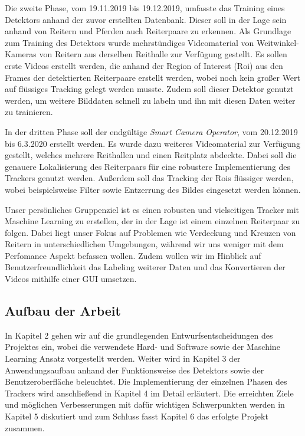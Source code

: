 Die zweite Phase, vom 19.11.2019 bis 19.12.2019, umfasste das Training eines Detektors anhand der zuvor erstellten Datenbank. Dieser soll in der Lage sein anhand von Reitern und Pferden auch Reiterpaare zu erkennen. Als Grundlage zum Training des Detektors wurde mehrstündiges Videomaterial von Weitwinkel-Kameras von Reitern aus derselben Reithalle zur Verfügung gestellt. Es sollen erste Videos erstellt werden, die anhand der Region of Interest (Roi) aus den Frames der detektierten Reiterpaare erstellt werden, wobei noch kein großer Wert auf flüssiges Tracking gelegt werden musste. Zudem soll dieser Detektor genutzt werden, um weitere Bilddaten schnell zu labeln und ihn mit diesen Daten weiter zu trainieren.

In der dritten Phase soll der endgültige \emph{Smart Camera Operator}, vom 20.12.2019 bis 6.3.2020 erstellt werden. Es wurde dazu weiteres Videomaterial zur Verfügung gestellt, welches mehrere Reithallen und einen Reitplatz abdeckte. Dabei soll die genauere Lokalisierung des Reiterpaars für eine robustere Implementierung des Trackers genutzt werden. Außerdem soll das Tracking der Rois flüssiger werden, wobei beispielsweise Filter sowie Entzerrung des Bildes eingesetzt werden können.

Unser persönliches Gruppenziel ist es einen robusten und vielseitigen Tracker mit Maschine Learning zu erstellen, der in der Lage ist einem einzelnen Reiterpaar zu folgen. Dabei liegt unser Fokus auf Problemen wie Verdeckung und Kreuzen von Reitern in unterschiedlichen Umgebungen, während wir uns weniger mit dem Perfomance Aspekt befassen wollen. Zudem wollen wir im Hinblick auf Benutzerfreundlichkeit das Labeling weiterer Daten und das Konvertieren der Videos mithilfe einer GUI umsetzen.




\subsection*{Aufbau der Arbeit}
In Kapitel 2 gehen wir auf die grundlegenden Entwurfsentscheidungen des Projektes ein, wobei die verwendete Hard- und Software sowie der Maschine Learning Ansatz vorgestellt werden. Weiter wird in Kapitel 3 der Anwendungsaufbau anhand der Funktionsweise des Detektors sowie der Benutzeroberfläche beleuchtet. Die Implementierung der einzelnen Phasen des Trackers wird anschließend in Kapitel 4 im Detail erläutert. Die erreichten Ziele und möglichen Verbesserungen mit dafür wichtigen Schwerpunkten werden in Kapitel 5 diskutiert und zum Schluss fasst Kapitel 6 das erfolgte Projekt zusammen.